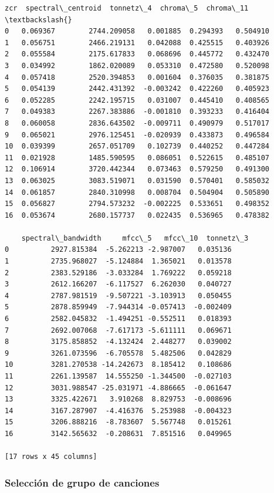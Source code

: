 \documentclass[11pt]{article}
\begin{document}
\begin{tcolorbox}[breakable, size=fbox, boxrule=.5pt, pad at break*=1mm, opacityfill=0]
\begin{Verbatim}[commandchars=\\\{\}]
         zcr  spectral\_centroid  tonnetz\_4  chroma\_5  chroma\_11  \textbackslash{}
0   0.069367        2744.209058   0.001885  0.294393   0.504910
1   0.056751        2466.219131   0.042088  0.425515   0.403926
2   0.055584        2175.617833   0.068696  0.445772   0.432470
3   0.034992        1862.020089   0.053310  0.472580   0.520098
4   0.057418        2520.394853   0.001604  0.376035   0.381875
5   0.054139        2442.431392  -0.003242  0.422260   0.405923
6   0.052285        2242.195715   0.031007  0.445410   0.408565
7   0.049383        2267.383886  -0.001810  0.393233   0.416404
8   0.060058        2836.643502  -0.009711  0.490979   0.517017
9   0.065021        2976.125451  -0.020939  0.433873   0.496584
10  0.039399        2657.051709   0.102739  0.440252   0.447284
11  0.021928        1485.590595   0.086051  0.522615   0.485107
12  0.106914        3720.442344   0.073463  0.579250   0.491300
13  0.063025        3083.519071   0.031590  0.570401   0.585032
14  0.061857        2840.310998   0.008704  0.504904   0.505890
15  0.056827        2794.573232  -0.002225  0.533651   0.498352
16  0.053674        2680.157737   0.022435  0.536965   0.478382

    spectral\_bandwidth     mfcc\_5   mfcc\_10  tonnetz\_3
0          2927.815384  -5.262213 -2.987007   0.035136
1          2735.968027  -5.124884  1.365021   0.013578
2          2383.529186  -3.033284  1.769222   0.059218
3          2612.166207  -6.117527  6.262030   0.040727
4          2787.981519  -9.507221 -3.103913   0.050455
5          2878.859949  -7.944314 -0.057413  -0.002409
6          2582.045832  -1.494251 -0.552511   0.018393
7          2692.007068  -7.617173 -5.611111   0.069671
8          3175.858852  -4.132424  2.448277   0.039002
9          3261.073596  -6.705578  5.482506   0.042829
10         3281.270538 -14.242673  8.185412   0.108686
11         2261.139587  14.555250 -1.344500  -0.027103
12         3031.988547 -25.031971 -4.886665  -0.061647
13         3325.422671   3.910268  8.829753  -0.008696
14         3167.287907  -4.416376  5.253988  -0.004323
15         3206.888216  -8.783607  5.567748   0.015261
16         3142.565632  -0.208631  7.851516   0.049965

[17 rows x 45 columns]
\end{Verbatim}
\end{tcolorbox}
        
    \hypertarget{selecciuxf3n-de-grupo-de-canciones}{%
\subsubsection{Selección de grupo de
canciones}\label{selecciuxf3n-de-grupo-de-canciones}}
\end{document}
